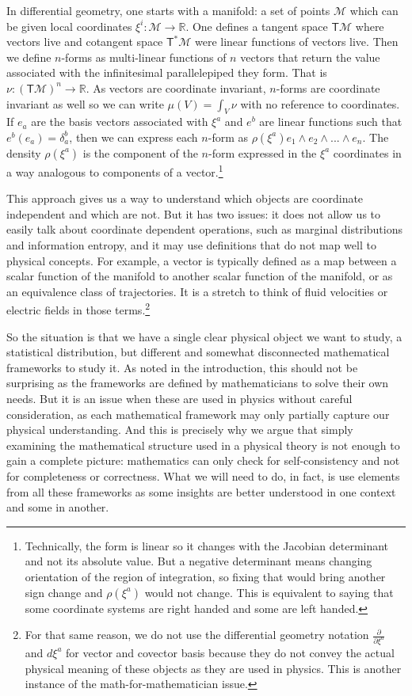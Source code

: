 \documentclass[11pt]{article}
\begin{document}
In differential geometry, one starts with a manifold: a set of points $\mathcal{M}$ which can be given local coordinates $\xi^i : \mathcal{M} \to \mathbb{R}$. One defines a tangent space $\mathsf{T}\mathcal{M}$ where vectors live and cotangent space $\mathsf{T}^*\mathcal{M}$ were linear functions of vectors live. Then we define $n$-forms as multi-linear functions of $n$ vectors that return the value associated with the infinitesimal parallelepiped they form. That is $\nu : (\mathsf{T}\mathcal{M})^n \rightarrow \mathbb{R}$. As vectors are coordinate invariant, $n$-forms are coordinate invariant as well so we can write $\mu(V)=\int_V \nu$ with no reference to coordinates. If $e_a$ are the basis vectors associated with $\xi^a$ and $e^b$ are linear functions such that $e^b(e_a)=\delta_a^b$, then we can express each $n$-form as $\rho(\xi^a)e_1\wedge e_2 \wedge ... \wedge e_n$. The density $\rho(\xi^a)$ is the component of the $n$-form expressed in the $\xi^a$ coordinates in a way analogous to components of a vector.\footnote{Technically, the form is linear so it changes with the Jacobian determinant and not its absolute value. But a negative determinant means changing orientation of the region of integration, so fixing that would bring another sign change and $\rho(\xi^a)$ would not change. This is equivalent to saying that some coordinate systems are right handed and some are left handed.}

This approach gives us a way to understand which objects are coordinate independent and which are not. But it has two issues: it does not allow us to easily talk about coordinate dependent operations, such as marginal distributions and information entropy, and it may use definitions that do not map well to physical concepts. For example, a vector is typically defined as a map between a scalar function of the manifold to another scalar function of the manifold, or as an equivalence class of trajectories. It is a stretch to think of fluid velocities or electric fields in those terms.\footnote{For that same reason, we do not use the differential geometry notation $\frac{\partial}{\partial \xi^a}$ and $d\xi^a$ for vector and covector basis because they do not convey the actual physical meaning of these objects as they are used in physics. This is another instance of the math-for-mathematician issue.}

So the situation is that we have a single clear physical object we want to study, a statistical distribution, but different and somewhat disconnected mathematical frameworks to study it. As noted in the introduction, this should not be surprising as the frameworks are defined by mathematicians to solve their own needs. But it is an issue when these are used in physics without careful consideration, as each mathematical framework may only partially capture our physical understanding. And this is precisely why we argue that simply examining the mathematical structure used in a physical theory is not enough to gain a complete picture: mathematics can only check for self-consistency and not for completeness or correctness. What we will need to do, in fact, is use elements from all these frameworks as some insights are better understood in one context and some in another.
\end{document}
